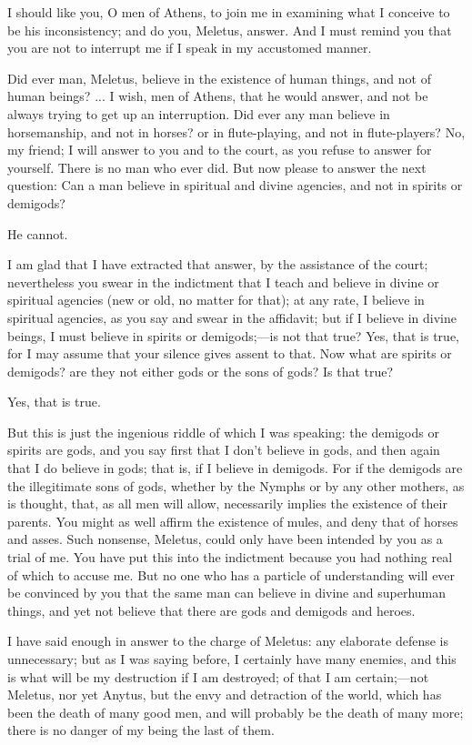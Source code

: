 \documentclass[12pt]{article}
\begin{document}
I should like you, O men of Athens, to join me in examining what I
conceive to be his inconsistency; and do you, Meletus, answer. And
I must remind you that you are not to interrupt me if I speak in my
accustomed manner.

Did ever man, Meletus, believe in the existence of human things, and
not of human beings? ... I wish, men of Athens, that he would answer,
and not be always trying to get up an interruption. Did ever any man
believe in horsemanship, and not in horses? or in flute-playing, and
not in flute-players? No, my friend; I will answer to you and to the
court, as you refuse to answer for yourself. There is no man who ever
did. But now please to answer the next question: Can a man believe
in spiritual and divine agencies, and not in spirits or demigods?

He cannot.

I am glad that I have extracted that answer, by the assistance of
the court; nevertheless you swear in the indictment that I teach and
believe in divine or spiritual agencies (new or old, no matter for
that); at any rate, I believe in spiritual agencies, as you say and
swear in the affidavit; but if I believe in divine beings, I must
believe in spirits or demigods;---is not that true? Yes, that is true,
for I may assume that your silence gives assent to that. Now what
are spirits or demigods? are they not either gods or the sons of gods?
Is that true?

Yes, that is true.

But this is just the ingenious riddle of which I was speaking: the
demigods or spirits are gods, and you say first that I don't believe
in gods, and then again that I do believe in gods; that is, if I believe
in demigods. For if the demigods are the illegitimate sons of gods,
whether by the Nymphs or by any other mothers, as is thought, that,
as all men will allow, necessarily implies the existence of their
parents. You might as well affirm the existence of mules, and deny
that of horses and asses. Such nonsense, Meletus, could only have
been intended by you as a trial of me. You have put this into the
indictment because you had nothing real of which to accuse me. But
no one who has a particle of understanding will ever be convinced
by you that the same man can believe in divine and superhuman things,
and yet not believe that there are gods and demigods and heroes.

I have said enough in answer to the charge of Meletus: any elaborate
defense is unnecessary; but as I was saying before, I certainly have
many enemies, and this is what will be my destruction if I am destroyed;
of that I am certain;---not Meletus, nor yet Anytus, but the envy
and detraction of the world, which has been the death of many good
men, and will probably be the death of many more; there is no danger
of my being the last of them.
\end{document}
